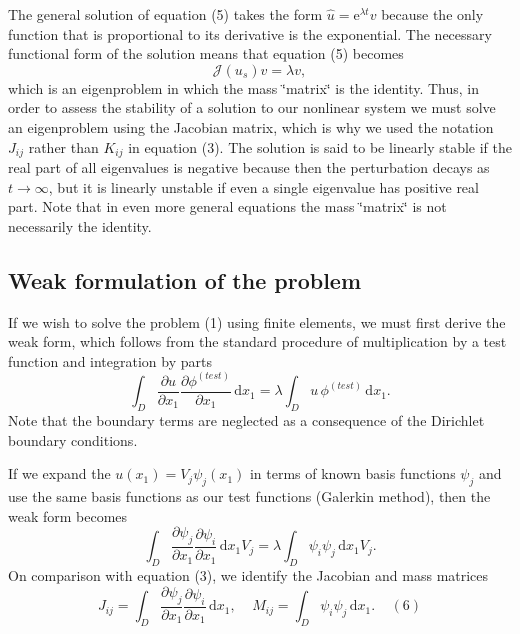 The general solution of equation (5) takes the form $ \hat{u} = \mbox{e}^{\lambda t} v$ because the only function that is proportional to its derivative is the exponential. The necessary functional form of the solution means that equation (5) becomes \[ \mathcal{J}(u_{s}) v = \lambda v, \] which is an eigenproblem in which the mass \char`\"{}matrix\char`\"{} is the identity. Thus, in order to assess the stability of a solution to our nonlinear system we must solve an eigenproblem using the Jacobian matrix, which is why we used the notation $ J_{ij} $ rather than $ K_{ij} $ in equation (3). The solution is said to be linearly stable if the real part of all eigenvalues is negative because then the perturbation decays as $ t \to \infty$, but it is linearly unstable if even a single eigenvalue has positive real part. Note that in even more general equations the mass \char`\"{}matrix\char`\"{} is not necessarily the identity.\hypertarget{index_weak}{}\subsection{Weak formulation of the problem}\label{index_weak}
If we wish to solve the problem (1) using finite elements, we must first derive the weak form, which follows from the standard procedure of multiplication by a test function and integration by parts \[ \int_{D} \frac{\partial u}{\partial x_{1}} \frac{\partial \phi^{(test)}}{\partial x_{1}}\,\mbox{d} x_{1} = \lambda \int_{D} u\, \phi^{(test)}\,\mbox{d} x_{1}. \] Note that the boundary terms are neglected as a consequence of the Dirichlet boundary conditions.

If we expand the $ u(x_{1}) = V_{j} \psi_{j}(x_{1}) $ in terms of known basis functions $ \psi_{j} $ and use the same basis functions as our test functions (Galerkin method), then the weak form becomes \[ \int_{D} \frac{\partial \psi_{j}}{\partial x_{1}} \frac{\partial \psi_{i}}{\partial x_{1}}\,\mbox{d} x_{1} V_{j} = \lambda \int_{D} \psi_{i} \psi_{j}\,\mbox{d} x_{1} V_{j}. \] On comparison with equation (3), we identify the Jacobian and mass matrices \[ J_{ij} = \int_{D} \frac{\partial \psi_{j}}{\partial x_{1}} \frac{\partial \psi_{i}}{\partial x_{1}}\,\mbox{d} x_{1}, \ \ \ \ \ M_{ij} = \int_{D} \psi_{i} \psi_{j}\,\mbox{d} x_{1}. \ \ \ \ \ (6) \]



 

